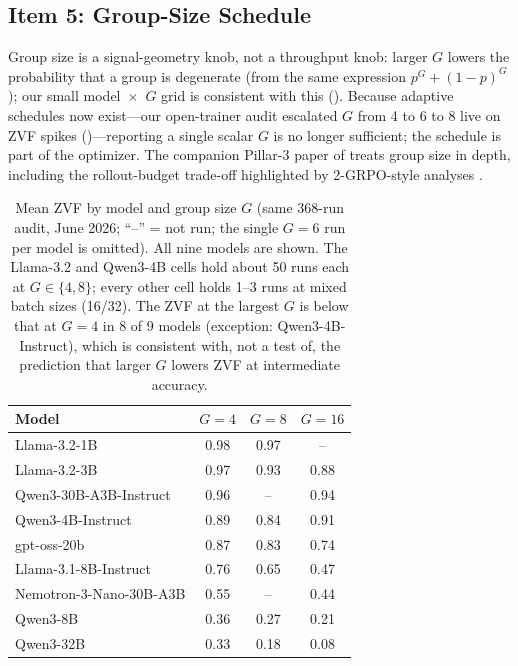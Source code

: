 \subsection{Item 5: Group-Size Schedule}
\label{sec:p5-item5}
Group size is a signal-geometry knob, not a throughput knob: larger $G$ lowers
the probability that a group is degenerate (from the same expression
$p^G + (1-p)^G$); our small model~$\times$~$G$ grid is consistent with this
(). Because adaptive schedules now exist---our
open-trainer audit escalated $G$ from 4 to 6 to 8 live on ZVF spikes
()---reporting a single scalar $G$ is no longer
sufficient; the schedule is part of the optimizer. The companion Pillar-3
paper of \ours{} treats group size in depth, including the rollout-budget
trade-off highlighted by 2-GRPO-style analyses \citep{wu2025grpodpo,
tan2025scalingrl}.

\begin{table}[t]
\centering
\caption{Mean ZVF by model and group size $G$ (same 368-run audit,
June 2026; ``--'' = not run; the single $G{=}6$ run per model is omitted).
All nine models are shown. The Llama-3.2 and Qwen3-4B cells hold about 50
runs each at $G\in\{4,8\}$; every other cell holds 1--3 runs at mixed batch
sizes (16/32). The ZVF at the largest $G$ is below that at $G{=}4$ in 8 of 9
models (exception: Qwen3-4B-Instruct), which is consistent with, not a test
of, the prediction that larger $G$ lowers ZVF at intermediate accuracy.}
\label{tab:p5-gsize}
\small
\begin{tabular}{@{}lccc@{}}
\toprule
Model & $G=4$ & $G=8$ & $G=16$ \\
\midrule
Llama-3.2-1B      & 0.98 & 0.97 & --   \\
Llama-3.2-3B      & 0.97 & 0.93 & 0.88 \\
Qwen3-30B-A3B-Instruct & 0.96 & -- & 0.94 \\
Qwen3-4B-Instruct & 0.89 & 0.84 & 0.91 \\
gpt-oss-20b       & 0.87 & 0.83 & 0.74 \\
Llama-3.1-8B-Instruct & 0.76 & 0.65 & 0.47 \\
Nemotron-3-Nano-30B-A3B & 0.55 & -- & 0.44 \\
Qwen3-8B          & 0.36 & 0.27 & 0.21 \\
Qwen3-32B         & 0.33 & 0.18 & 0.08 \\
\bottomrule
\end{tabular}
\end{table}

